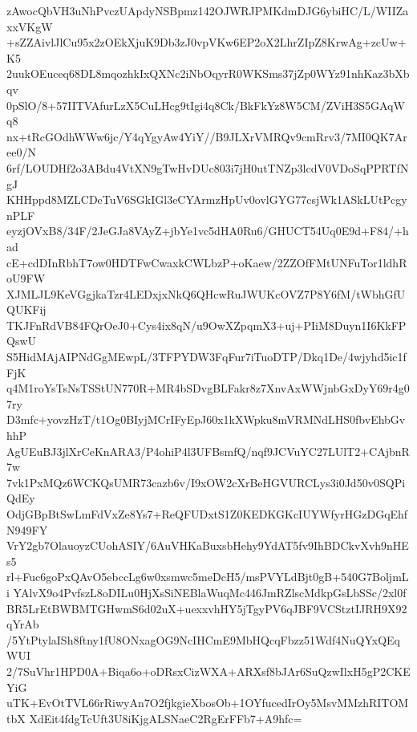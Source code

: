 zAwocQbVH3uNhPvczUApdyNSBpmz142OJWRJPMKdmDJG6ybiHC/L/WIIZaxxVKgW
+sZZAivlJlCu95x2zOEkXjuK9Db3zJ0vpVKw6EP2oX2LhrZIpZ8KrwAg+zcUw+K5
2uukOEuceq68DL8mqozhkIxQXNc2iNbOqyrR0WKSms37jZp0WYz91nhKaz3bXbqv
0pSlO/8+57IITVAfurLzX5CuLHcg9tIgi4q8Ck/BkFkYz8W5CM/ZViH3S5GAqWq8
nx+tRcGOdhWWw6jc/Y4qYgyAw4YiY//B9JLXrVMRQv9cmRrv3/7MI0QK7Aree0/N
6rf/LOUDHf2o3ABdu4VtXN9gTwHvDUc803i7jH0utTNZp3lcdV0VDoSqPPRTfNgJ
KHHppd8MZLCDeTuV6SGkIGl3eCYArmzHpUv0ovlGYG77csjWk1ASkLUtPcgynPLF
eyzjOVxB8/34F/2JeGJa8VAyZ+jbYe1vc5dHA0Ru6/GHUCT54Uq0E9d+F84/+had
cE+cdDInRbhT7ow0HDTFwCwaxkCWLbzP+oKaew/2ZZOfFMtUNFuTor1ldhRoU9FW
XJMLJL9KeVGgjkaTzr4LEDxjxNkQ6QHcwRuJWUKcOVZ7P8Y6fM/tWbhGfUQUKFij
TKJFnRdVB84FQrOeJ0+Cys4ix8qN/u9OwXZpqmX3+uj+PIiM8Duyn1I6KkFPQswU
S5HidMAjAIPNdGgMEwpL/3TFPYDW3FqFur7iTuoDTP/Dkq1De/4wjyhd5ic1fFjK
q4M1roYsTsNsTSStUN770R+MR4bSDvgBLFakr8z7XnvAxWWjnbGxDyY69r4g07ry
D3mfc+yovzHzT/t1Og0BIyjMCrIFyEpJ60x1kXWpku8mVRMNdLHS0fbvEhbGvhhP
AgUEuBJ3jlXrCeKnARA3/P4ohiP4l3UFBsmfQ/nqf9JCVuYC27LUlT2+CAjbnR7w
7vk1PxMQz6WCKQsUMR73cazb6v/I9xOW2cXrBeHGVURCLys3i0Jd50v0SQPiQdEy
OdjGBpBtSwLmFdVxZe8Ys7+ReQFUDxtS1Z0KEDKGKcIUYWfyrHGzDGqEhfN949FY
VrY2gb7OlauoyzCUohASIY/6AuVHKaBuxsbHehy9YdAT5fv9IhBDCkvXvh9nHEs5
rl+Fuc6goPxQAvO5ebccLg6w0xsmwc5meDcH5/msPVYLdBjt0gB+540G7BoljmLi
YAlvX9o4PvfszL8oDILu0HjXsSiNEBlaWuqMc446JmRZlscMdkpGsLbSSc/2xl0f
BR5LrEtBWBMTGHwmS6d02uX+uexxvhHY5jTgyPV6qJBF9VCStztIJRH9X92qYrAb
/5YtPtylaISh8ftny1fU8ONxagOG9NcIHCmE9MbHQcqFbzz51Wdf4NuQYxQEqWUI
2/7SuVhr1HPD0A+Biqa6o+oDRsxCizWXA+ARXsf8bJAr6SuQzwIlxH5gP2CKEYiG
uTK+EvOtTVL66rRiwyAn7O2fjkgieXbosOb+1OYfucedIrOy5MsvMMzhRITOMtbX
XdEit4fdgTcUft3U8iKjgALSNaeC2RgErFFb7+A9hfc=
